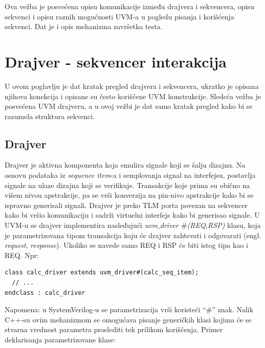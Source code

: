 %
% 

Ova vežba je posvećena opisu komunikacije između drajvera i sekvencera, opisu
sekvenci i opisu raznih mogućnosti UVM-a u pogledu pisanja i korišćenja
sekvenci. Dat je i opis mehanizma završetka testa.


\section{Drajver - sekvencer interakcija}

U ovom poglavlju je dat kratak pregled drajvera i sekvencera, ukratko je opisana
njihova konekcija i opisane su često korišćene UVM konstrukcije. Sledeća vežba
je posvećena UVM drajveru, a u ovoj vežbi je dat samo kratak pregled kako bi se
razumela struktura sekvenci.


\subsection{Drajver}

Drajver je aktivna komponenta koja emulira signale koji se šalju dizajnu. Na
osnovu podataka iz \emph{sequence item}-a i semplovanja signal na interfejsu,
postavlja signale na ulaze dizajna koji se verifikuje. Transakcije koje prima su
obično na višem nivou apstrakcije, pa se vrši konverzija na pin-nivo apstrakcije
kako bi se ispravno generisali signali. Drajver je preko TLM porta povezan na
sekvencer kako bi vršio komunikaciju i sadrži virtuelni interfejs kako bi
generisao signale. U UVM-u se drajver implementira nasleđujući
\emph{uvm\(\_\)driver \(\#\)(REQ,RSP)} klasu, koja je parametrizovana tipom
transakcija koju će drajver zahtevati i odgovarati (engl. \emph{request},
\emph{response}). Ukoliko se navede samo REQ i RSP će biti istog tipa kao i REQ.
Npr:

\begin{lstlisting}
class calc_driver extends uvm_driver#(calc_seq_item);
  // ...
endclass : calc_driver
\end{lstlisting}

Napomena: u SystemVerilog-u se parametrizacija vrši koristeći ``\(\#\)'' znak.
Nalik C++-su ovim mehanizmom se omogućava pisanje generičkih klasi kojima će se
stvarna vrednost parametra proslediti tek prilikom korišćenja. Primer
deklarisanja parametrizovane klase:

